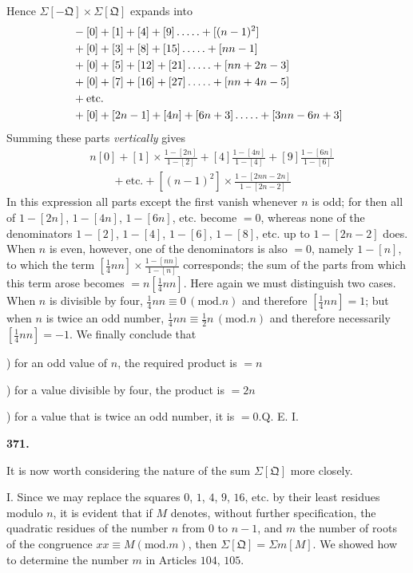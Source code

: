 Hence $\Sigma[-\mathfrak{Q}]\times\Sigma[\mathfrak{Q}]$ expands into
\[
\begin{aligned}
&-[0]+[1]+[4]+[9]\mathinner{.\,.\,.\,.\,.}+[(n-1)^2]\\
&+[0]+[3]+[8]+[15]\mathinner{.\,.\,.\,.\,.}+[nn-1]\\
&+[0]+[5]+[12]+[21]\mathinner{.\,.\,.\,.\,.}+[nn+2n-3]\\
&+[0]+[7]+[16]+[27]\mathinner{.\,.\,.\,.\,.}+[nn+4n-5]\\
&+\text{etc.}\\
&+[0]+[2n-1]+[4n]+[6n+3]\mathinner{.\,.\,.\,.\,.}+[3nn-6n+3]
\end{aligned}
\]
Summing these parts \textit{vertically} gives
\[
\begin{aligned}
&n[0]+[1]\times\frac{1-[2n]}{1-[2]}+[4]\frac{1-[4n]}{1-[4]}+[9]\frac{1-[6n]}{1-[6]}\\
&\qquad+\text{etc.}+[(n-1)^2]\times\frac{1-[2nn-2n]}{1-[2n-2]}
\end{aligned}
\]
In this expression all parts except the first vanish whenever $n$ is odd; for then all of $1-[2n]$, $1-[4n]$, $1-[6n]$, etc. become $=0$, whereas none of the denominators $1-[2]$, $1-[4]$, $1-[6]$, $1-[8]$, etc. up to $1-[2n-2]$ does. When $n$ is even, however, one of the denominators is also $=0$, namely $1-[n]$, to which the term $[\frac14nn]\times\frac{1-[nn]}{1-[n]}$ corresponds; the sum of the parts from which this term arose becomes $=n[\frac14nn]$. Here again we must distinguish two cases. When $n$ is divisible by four, $\frac14nn\equiv0\, (\mathrm{mod}.n)$ and therefore $[\frac14nn]=1$; but when $n$ is twice an odd number, $\frac14nn\equiv\frac12n\, (\mathrm{mod}.n)$ and therefore necessarily $[\frac14nn]=-1$. We finally conclude that
\par{}) for an odd value of $n$, the required product is $=n$
\par{}) for a value divisible by four, the product is $=2n$
\par{}) for a value that is twice an odd number, it is $=0$.\quad Q. E. I.
\par\medskip{}\centerline{\textbf{371.}}\nobreak\smallskip
It is now worth considering the nature of the sum $\Sigma[\mathfrak{Q}]$ more closely.
\par I. Since we may replace the squares $0$, $1$, $4$, $9$, $16$, etc. by their least residues modulo $n$, it is evident that if $M$ denotes, without further specification, the quadratic residues of the number $n$ from $0$ to $n-1$, and $m$ the number of roots of the congruence $xx\equiv M(\mathrm{mod}.m)$, then $\Sigma[\mathfrak{Q}]=\Sigma m[M]$. We showed how to determine the number $m$ in Articles $104$, $105$.
